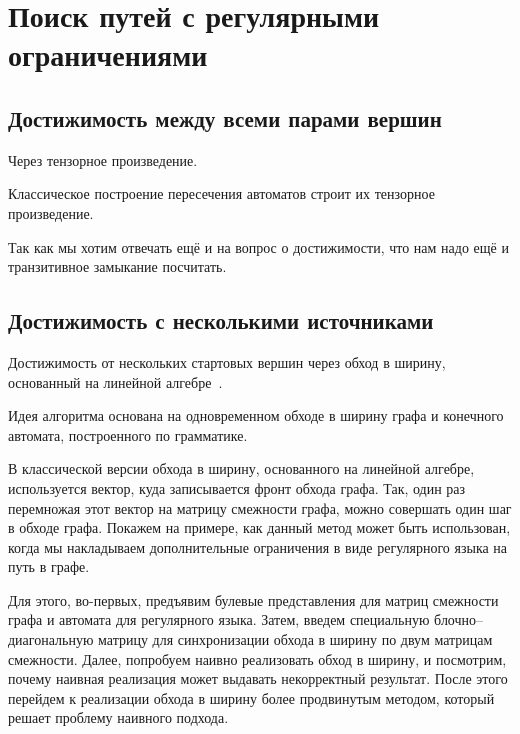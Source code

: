 \chapter{Поиск путей с регулярными ограничениями}

\section{Достижимость между всеми парами вершин}

Через тензорное произведение.

Классическое построение пересечения автоматов строит их тензорное произведение.

Так как мы хотим отвечать ещё и на вопрос о достижимости, что нам надо ещё и транзитивное замыкание посчитать.

\section{Достижимость с несколькими источниками}

Достижимость от нескольких стартовых вершин через обход в ширину, основанный на линейной алгебре~\cite{9286186}.

Идея алгоритма основана на одновременном обходе в ширину графа и конечного автомата, построенного по грамматике.

В классической версии обхода в ширину, основанного на линейной алгебре, используется вектор, куда записывается фронт обхода графа.
Так, один раз перемножая этот вектор на матрицу смежности графа, можно совершать один шаг в обходе графа.
Покажем на примере, как данный метод может быть использован, когда мы накладываем дополнительные ограничения в виде регулярного языка на путь в графе. 

Для этого, во-первых, предъявим булевые представления для матриц смежности графа и автомата для регулярного языка. Затем, введем специальную блочно--диагональную матрицу 
для синхронизации обхода в ширину по двум матрицам смежности. Далее, попробуем наивно реализовать обход в ширину, и посмотрим, почему наивная реализация
может выдавать некорректный результат.
После этого перейдем к реализации обхода в ширину более продвинутым методом, который решает проблему наивного подхода.

